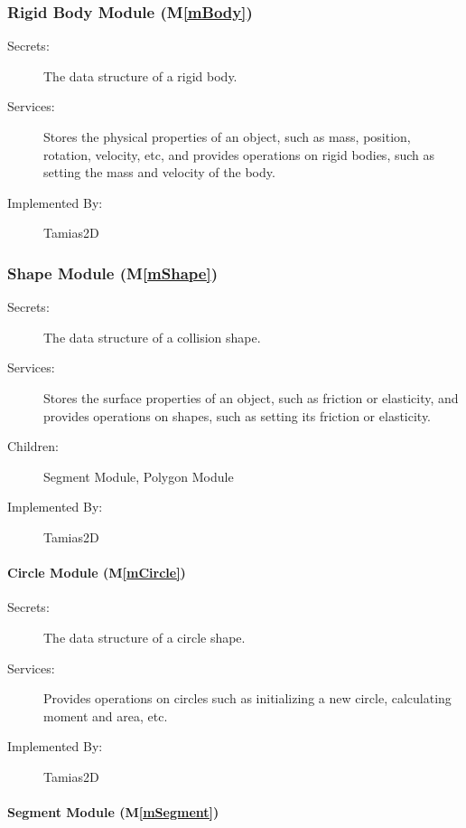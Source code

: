 \documentclass[12pt]{article}
\newcommand{\mref}[1]{M\ref{#1}}
\newcommand{\progname}{Tamias2D}
\begin{document}
\subsubsection{Rigid Body Module (\mref{mBody})}

\begin{description}
\item[Secrets:]The data structure of a rigid body.
\item[Services:]Stores the physical properties of an object, such as mass, 
position, rotation, velocity, etc, and provides operations on rigid bodies, such as setting the mass and velocity of the body.

\item[Implemented By:] \progname
\end{description}

\subsubsection{Shape Module (\mref{mShape})}

\begin{description}
\item[Secrets:]The data structure of a collision shape.
\item[Services:]Stores the surface properties of an object, such as friction or elasticity, and provides operations on shapes, such as setting its friction or elasticity.
\item[Children:] Segment Module, Polygon Module
\item[Implemented By:] \progname 
\end{description}

\paragraph{Circle Module (\mref{mCircle})}

\begin{description}
	\item[Secrets:] The data structure of a circle shape.
	\item[Services:] Provides operations on circles such as initializing a new circle, calculating moment and area, etc.
	\item[Implemented By:] \progname
\end{description}

\paragraph{Segment Module (\mref{mSegment})}
\end{document}
